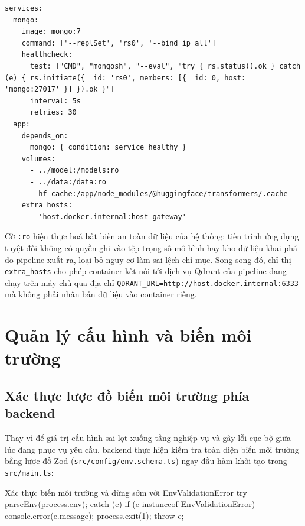 \begin{verbatim}
services:
  mongo:
    image: mongo:7
    command: ['--replSet', 'rs0', '--bind_ip_all']
    healthcheck:
      test: ["CMD", "mongosh", "--eval", "try { rs.status().ok } catch (e) { rs.initiate({ _id: 'rs0', members: [{ _id: 0, host: 'mongo:27017' }] }).ok }"]
      interval: 5s
      retries: 30
  app:
    depends_on:
      mongo: { condition: service_healthy }
    volumes:
      - ../model:/models:ro
      - ../data:/data:ro
      - hf-cache:/app/node_modules/@huggingface/transformers/.cache
    extra_hosts:
      - 'host.docker.internal:host-gateway'
\end{verbatim}

Cờ \texttt{:\allowbreak{}ro} hiện thực hoá bất biến an toàn dữ liệu của hệ thống: tiến trình ứng dụng tuyệt đối không có quyền ghi vào tệp trọng số mô hình hay kho dữ liệu khai phá do pipeline xuất ra, loại bỏ nguy cơ làm sai lệch chỉ mục. Song song đó, chỉ thị \texttt{extra\_\allowbreak{}hosts} cho phép container kết nối tới dịch vụ Qdrant của pipeline đang chạy trên máy chủ qua địa chỉ \texttt{QDRANT\_\allowbreak{}URL=\allowbreak{}http:\allowbreak{}/\allowbreak{}/\allowbreak{}host.\allowbreak{}docker.\allowbreak{}internal:\allowbreak{}6333} mà không phải nhân bản dữ liệu vào container riêng.

\section{Quản lý cấu hình và biến môi trường}
\label{sec:quan-ly-cau-hinh}

\subsection{Xác thực lược đồ biến môi trường phía backend}
\label{subsec:xac-thuc-env-be}

Thay vì để giá trị cấu hình sai lọt xuống tầng nghiệp vụ và gây lỗi cục bộ giữa lúc đang phục vụ yêu cầu, backend thực hiện kiểm tra toàn diện biến môi trường bằng lược đồ Zod (\texttt{src/\allowbreak{}config/\allowbreak{}env.\allowbreak{}schema.\allowbreak{}ts}) ngay đầu hàm khởi tạo trong \texttt{src/\allowbreak{}main.\allowbreak{}ts}:

\begin{tsbox}{Xác thực biến môi trường và dừng sớm với EnvValidationError}
try {
  parseEnv(process.env);
} catch (e) {
  if (e instanceof EnvValidationError) {
    console.error(e.message);
    process.exit(1);
  }
  throw e;
}
\end{tsbox}

